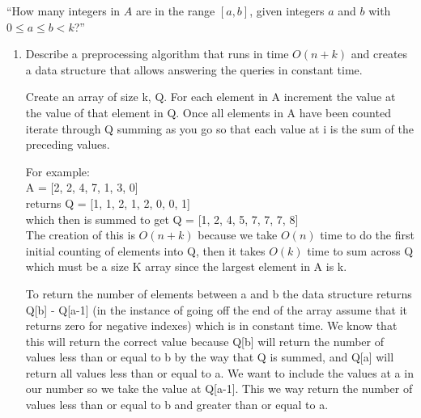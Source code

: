 \documentclass[12pt]{article}
\begin{document}
\begin{center}
  ``How many integers in $A$ are in the range $[a, b]$, given integers $a$ and
  $b$ with $0 \leq a \leq b < k$?''
\end{center}
\begin{enumerate}
  \item Describe a preprocessing algorithm that runs in time $O (n + k)$ and
  creates a data structure that allows answering the queries in constant time.

  Create an array of size k, Q. For each element in A increment the value at the value of that element in Q. Once all elements in A have been counted iterate through Q summing as you go so that each value at i is the sum of the preceding values.

  For example: \\
  A = [2, 2, 4, 7, 1, 3, 0]\\
  returns Q = [1, 1, 2, 1, 2, 0, 0, 1]\\
  which then is summed to get Q = [1, 2, 4, 5, 7, 7, 7, 8]\\

  The creation of this is $O(n+ k)$ because we take $O(n)$ time to do the first initial counting of elements into Q, then it takes $O(k)$ time to sum across Q which must be a size K array since the largest element in A is k.

  To return the number of elements between a and b the data structure returns Q[b] - Q[a-1] (in the instance of going off the end of the array assume that it returns zero for negative indexes) which is in constant time. We know that this will return the correct value because Q[b] will return the number of values less than or equal to b by the way that Q is summed, and Q[a] will return all values less than or equal to a. We want to include the values at a in our number so we take the value at Q[a-1]. This we way return the number of values less than or equal to b and greater than or equal to a.


\end{enumerate}
\end{document}
